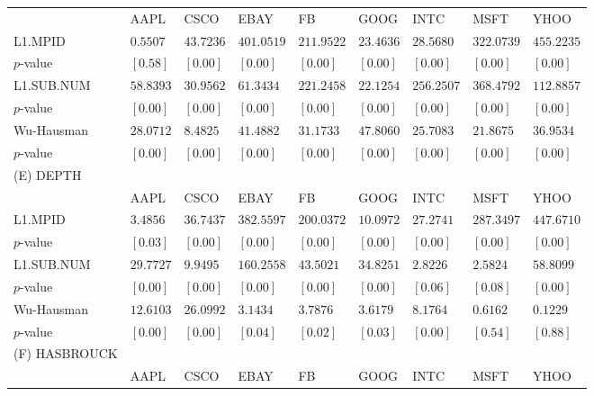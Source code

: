 \documentclass{article}
\begin{document}
\begin{table}[]
{\begin{tabular}{lllllllll}
 & AAPL                & CSCO  & EBAY  & FB    & GOOG  & INTC  & MSFT  & YHOO       \\
L1.MPID & $0.5507$  & $43.7236$ & $401.0519$ & $211.9522$ & $23.4636$ & $28.5680$  & $322.0739$ & $455.2235$ \\
$p$-value               & $[0.58]$  & $[0.00]$  & $[0.00]$   & $[0.00]$   & $[0.00]$  & $[0.00]$   & $[0.00]$   & $[0.00]$   \\
L1.SUB.NUM            & $58.8393$ & $30.9562$ & $61.3434$  & $221.2458$ & $22.1254$ & $256.2507$ & $368.4792$ & $112.8857$ \\
$p$-value                & $[0.00]$  & $[0.00]$  & $[0.00]$   & $[0.00]$   & $[0.00]$  & $[0.00]$   & $[0.00]$   & $[0.00]$   \\
Wu-Hausman            & $28.0712$ & $8.4825$  & $41.4882$  & $31.1733$  & $47.8060$ & $25.7083$  & $21.8675$  & $36.9534$  \\
$p$-value               & $[0.00]$  & $[0.00]$  & $[0.00]$   & $[0.00]$   & $[0.00]$  & $[0.00]$   & $[0.00]$   & $[0.00]$  \\
(E) DEPTH                 &           &            &            &            &           &            &            &            \\
 & AAPL                & CSCO  & EBAY  & FB    & GOOG  & INTC  & MSFT  & YHOO       \\
L1.MPID & $3.4856$  & $36.7437$ & $382.5597$ & $200.0372$ & $10.0972$ & $27.2741$ & $287.3497$ & $447.6710$ \\
$p$-value                 & $[0.03]$  & $[0.00]$  & $[0.00]$   & $[0.00]$   & $[0.00]$  & $[0.00]$  & $[0.00]$   & $[0.00]$   \\
L1.SUB.NUM           & $29.7727$ & $9.9495$  & $160.2558$ & $43.5021$  & $34.8251$ & $2.8226$  & $2.5824$   & $58.8099$  \\
$p$-value                 & $[0.00]$  & $[0.00]$  & $[0.00]$   & $[0.00]$   & $[0.00]$  & $[0.06]$  & $[0.08]$   & $[0.00]$   \\
Wu-Hausman             & $12.6103$ & $26.0992$ & $3.1434$   & $3.7876$   & $3.6179$  & $8.1764$  & $0.6162$   & $0.1229$   \\
$p$-value                & $[0.00]$  & $[0.00]$  & $[0.04]$   & $[0.02]$   & $[0.03]$  & $[0.00]$  & $[0.54]$   & $[0.88]$  \\
(F) HASBROUCK               &           &            &            &            &           &            &            &            \\
 & AAPL                & CSCO  & EBAY  & FB    & GOOG  & INTC  & MSFT  & YHOO       \\

\end{tabular}}
\end{table}
\end{document}
